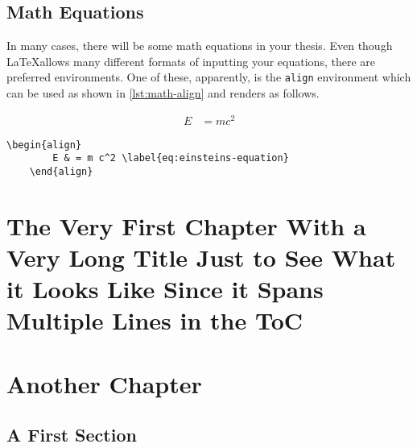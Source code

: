 \section{Math Equations}\label{sec:math-equations}

In many cases, there will be some math equations in your thesis.
Even though \LaTeX allows many different formats of inputting your equations, there are preferred environments.
One of these, apparently, is the \lstinline|align| environment which can be used as shown in \cref{lst:math-align} and renders as follows.

\begin{align}
    E & = m c^2 \label{eq:einsteins-equation}
\end{align}

\begin{lstlisting}[float,language={[LaTeX]TeX}, caption={Sample code for proper typesetting of math equations.},label={lst:math-align}]
    \begin{align}
        E & = m c^2 \label{eq:einsteins-equation}
    \end{align}
\end{lstlisting}



















\chapter[The Short Title of the Chapter Showing Up in the TOC and the Page Headers]{The Very First Chapter With a Very Long Title Just to See What it Looks Like Since it Spans Multiple Lines in the ToC}


\lipsum[1-3]

\chapter{Another Chapter}

\lipsum[1-3]

\section{A First Section}

\lipsum[1-3]

